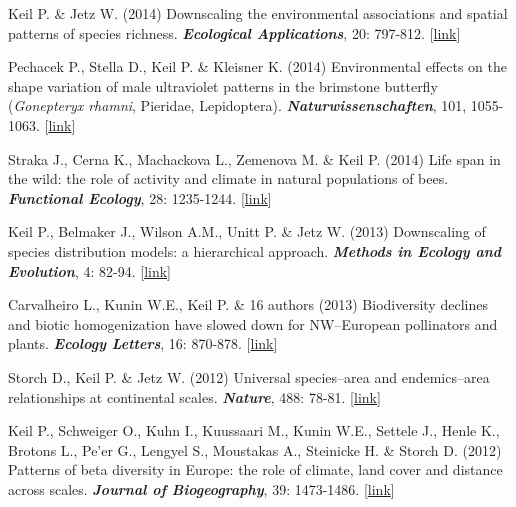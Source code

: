 \begin{etaremune}
\item Keil P. \& Jetz W. (2014) Downscaling the environmental associations and spatial patterns of species richness. \textit{\textbf{Ecological Applications}}, 20: 797-812. [\href{http://www.esajournals.org/doi/abs/10.1890/13-0805.1?af=R&}{link}] 

\item Pechacek P., Stella D., Keil P. \& Kleisner K. (2014) Environmental effects on the shape variation of male ultraviolet patterns in the brimstone butterfly (\textit{Gonepteryx rhamni}, Pieridae, Lepidoptera). \textit{\textbf{Naturwissenschaften}}, 101, 1055-1063.  [\href{http://link.springer.com/article/10.1007/s00114-014-1244-5}{link}] 

\item Straka J., Cerna K., Machackova L., Zemenova M. \& Keil P. (2014) Life span in the wild: the role of activity and climate in natural populations of bees. \textit{\textbf{Functional Ecology}}, 28: 1235-1244.
[\href{http://onlinelibrary.wiley.com/doi/10.1111/1365-2435.12261/abstract}{link}]

\item Keil P., Belmaker J., Wilson A.M., Unitt P. \& Jetz W. (2013) Downscaling of species distribution models: a hierarchical approach. \textit{\textbf{Methods in Ecology and Evolution}}, 4: 82-94. [\href{http://onlinelibrary.wiley.com/doi/10.1111/j.2041-210x.2012.00264.x/abstract}{link}]

\item Carvalheiro L., Kunin W.E., Keil P. \& 16 authors (2013) Biodiversity declines and biotic homogenization have slowed down for NW--European pollinators and plants. \textit{\textbf{Ecology Letters}}, 16: 870-878. [\href{http://onlinelibrary.wiley.com/doi/10.1111/ele.12121/abstract}{link}]

\item Storch D., Keil P. \& Jetz W. (2012) Universal species--area and endemics--area relationships at continental scales. \textit{\textbf{Nature}}, 488: 78-81. [\href{http://www.nature.com/nature/journal/v488/n7409/full/nature11226.html}{link}]

\item Keil P., Schweiger O., Kuhn I., Kuussaari M., Kunin W.E., Settele J., Henle K., Brotons L., Pe’er G., Lengyel S., Moustakas A., Steinicke H. \& Storch D. (2012) Patterns of beta diversity in Europe: the role of climate, land cover and distance across scales. \textit{\textbf{Journal of Biogeography}}, 39: 1473-1486. [\href{http://onlinelibrary.wiley.com/doi/10.1111/j.1365-2699.2012.02701.x/abstract}{link}]


\end{etaremune}
